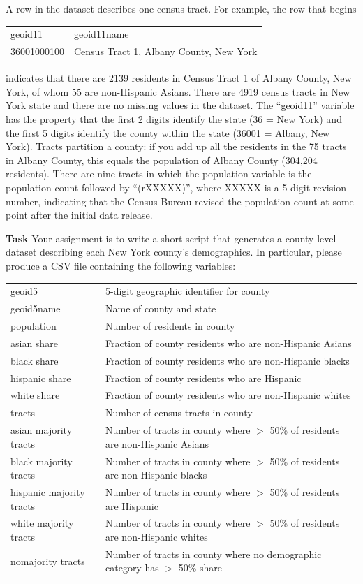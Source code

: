 \documentclass{article}
\begin{document}
\bigskip
A row in the dataset describes one census tract. For example, the row that begins

\bigskip
\hspace*{\fill}
\begin{tabular}{ll}
geoid11 & geoid11name\\
36001000100 & Census Tract 1, Albany County, New York
\end{tabular}
\hspace*{\fill}

\bigskip
indicates that there are 2139 residents in Census Tract 1 of Albany County, New York, of whom
55 are non-Hispanic Asians.
There are 4919 census tracts in New York state and there are no missing values in the dataset.
The “geoid11” variable has the property that the first 2 digits identify the state (36 = New York)
and the first 5 digits identify the county within the state (36001 = Albany, New York). Tracts
partition a county: if you add up all the residents in the 75 tracts in Albany County, this equals the
population of Albany County (304,204 residents). There are nine tracts in which the population
variable is the population count followed by “(rXXXXX)”, where XXXXX is a 5-digit revision
number, indicating that the Census Bureau revised the population count at some point after the
initial data release.

\bigskip
{\bf Task} Your assignment is to write a short script that generates a county-level dataset describing each
New York county's demographics. In particular, please produce a CSV file containing the following
variables:

\bigskip
\begin{tabular}{ll}
geoid5 & 5-digit geographic identifier for county\\
geoid5name & Name of county and state\\
population & Number of residents in county\\
asian share & Fraction of county residents who are non-Hispanic Asians\\
black share & Fraction of county residents who are non-Hispanic blacks\\
hispanic share & Fraction of county residents who are Hispanic\\
white share & Fraction of county residents who are non-Hispanic whites\\
tracts & Number of census tracts in county\\
asian majority tracts & Number of tracts in county where $>$ 50\% of residents are non-Hispanic Asians\\
black majority tracts & Number of tracts in county where $>$ 50\% of residents are non-Hispanic blacks\\
hispanic majority tracts & Number of tracts in county where $>$ 50\% of residents are Hispanic\\
white majority tracts & Number of tracts in county where $>$ 50\% of residents are non-Hispanic whites\\
nomajority tracts & Number of tracts in county where no demographic category has $>$ 50\% share
\end{tabular}
\end{document}
